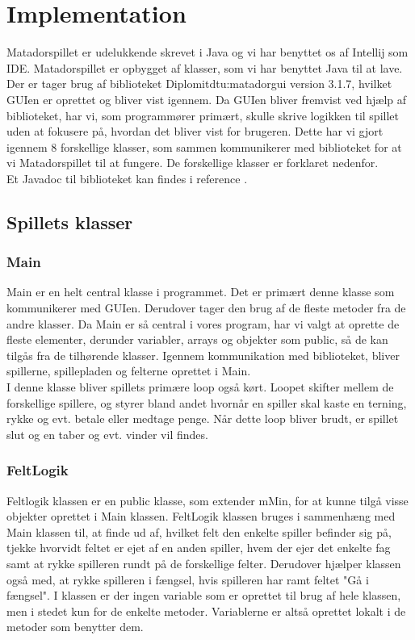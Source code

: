 \section{Implementation}
Matadorspillet er udelukkende skrevet i Java og vi har benyttet os af Intellij som IDE. Matadorspillet er opbygget af klasser, som vi har benyttet Java til at lave. \\
Der er tager brug af biblioteket Diplomitdtu:matadorgui version 3.1.7, hvilket GUIen er oprettet og bliver vist igennem. Da GUIen bliver fremvist ved hjælp af biblioteket, har vi, som programmører primært, skulle skrive logikken til spillet uden at fokusere på, hvordan det bliver vist for brugeren. Dette har vi gjort igennem 8 forskellige klasser, som sammen kommunikerer med biblioteket for at vi Matadorspillet til at fungere.
De forskellige klasser er forklaret nedenfor.\\
Et Javadoc til biblioteket kan findes i reference \cite{javadoc}. 
\\

\subsection{Spillets klasser}

\subsubsection{Main}
Main er en helt central klasse i programmet. Det er primært denne klasse som kommunikerer med GUIen. Derudover tager den brug af de fleste metoder fra de andre klasser. Da Main er så central i vores program, har vi valgt at oprette de fleste elementer, derunder variabler, arrays og objekter som public, så de kan tilgås fra de tilhørende klasser. Igennem kommunikation med biblioteket, bliver spillerne, spillepladen og felterne oprettet i Main.\\
I denne klasse bliver spillets primære loop også kørt. Loopet skifter mellem de forskellige spillere, og styrer bland andet hvornår en spiller skal kaste en terning, rykke og evt. betale eller medtage penge. Når dette loop bliver brudt, er spillet slut og en taber og evt. vinder vil findes.

\subsubsection{FeltLogik}
Feltlogik klassen er en public klasse, som extender mMin, for at kunne tilgå visse objekter oprettet i Main klassen. FeltLogik klassen bruges i sammenhæng med Main klassen til, at finde ud af, hvilket felt den enkelte spiller befinder sig på, tjekke hvorvidt feltet er ejet af en anden spiller, hvem der ejer det enkelte fag samt at rykke spilleren rundt på de forskellige felter. Derudover hjælper klassen også med, at rykke spilleren i fængsel, hvis spilleren har ramt feltet "Gå i fængsel". I klassen er der ingen variable som er oprettet til brug af hele klassen, men i stedet kun for de enkelte metoder. Variablerne er altså oprettet lokalt i de metoder som benytter dem.

